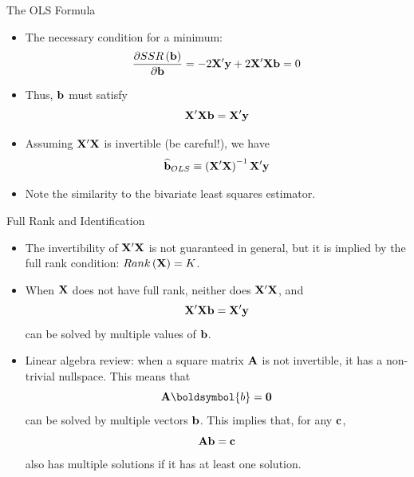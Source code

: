 \documentclass[aspectratio=169,11pt]{beamer}
\begin{document}
\begin{frame}{The OLS Formula}
\begin{itemize}
	\item The necessary condition for a minimum:\[
	\frac{\partial SSR\left({\bf b}\right)}{\partial {\bf b}} = - 2 {\bf X}' {\bf y} + 2 {\bf X}'{\bf X} {\bf b} = 0 
	\]

	\item Thus, ${\bf b}$ must satisfy\[
	{\bf X}'{\bf X} {\bf b} =  {\bf X}' {\bf y} 
	\]


	\item Assuming ${\bf X}'{\bf X}$ is invertible (be careful!), we have\[
	\widehat{{\bf b}}_{OLS} \equiv  \left({\bf X}'{\bf X}\right)^{-1} {\bf X}' {\bf y} 
	\]

	\item Note the similarity to the bivariate least squares estimator. 

\end{itemize}
\end{frame}


\begin{frame}{Full Rank and Identification}
\begin{itemize}
	\item The invertibility of ${\bf X}'{\bf X}$ is not guaranteed in general, but
	it is implied by the full rank condition: $Rank\left({\bf X}\right) = K$.

	\item When ${\bf X}$ does not have full rank, neither does ${\bf X}'{\bf X}$, and \[
	{\bf X}'{\bf X} {\bf b} =  {\bf X}' {\bf y} 
	\]
	can be solved by multiple values of ${\bf b}$. 

	\item Linear algebra review: when a square matrix ${\bf A}$ is not invertible, 
	it has a non-trivial nullspace. This means that \[
	{\bf A} \boldsymbol{b} =  {\bf 0}
	\]
	can be solved by multiple vectors ${\bf b}$. This implies that, for any ${\bf c} $,
	\[
	{\bf A} {\bf b} =  {\bf c} 
	\]
	also has multiple solutions if it has at least one solution. 
	

\end{itemize}
\end{frame}
\end{document}
